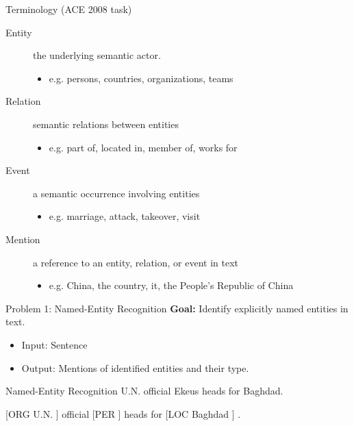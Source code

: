 \documentclass{beamer}
\begin{document}
\begin{frame}{Terminology (ACE 2008 task)}
  \begin{description}
    
  \item[Entity] the underlying semantic actor.
    \begin{itemize}
    \item e.g. persons, countries, organizations, teams
    \end{itemize}
   
  \item[Relation] semantic relations between entities
    \begin{itemize}
    \item e.g. part of, located in, member of, works for
    \end{itemize}

  \item[Event] a semantic occurrence involving entities
    \begin{itemize}
    \item e.g. marriage, attack, takeover, visit
    \end{itemize}

  \item[Mention] a reference to an entity, relation, or event in text
    \begin{itemize}
    \item e.g. China, the country, it, the People's Republic of China
    \end{itemize}
  \end{description}
\end{frame}

\begin{frame}{Problem 1: Named-Entity Recognition}
  \textbf{Goal:} Identify explicitly named entities in text.

  \begin{itemize}
  \item Input: Sentence
  \item Output: Mentions of identified entities and their type. 
  \end{itemize}
\end{frame}

\begin{frame}{Named-Entity Recognition}
  U.N. official Ekeus heads for Baghdad. 
  \air

  [ORG \alert{U.N.} ] official [PER  ] heads for [LOC \alert{Baghdad} ] .  
\end{frame}
\end{document}
